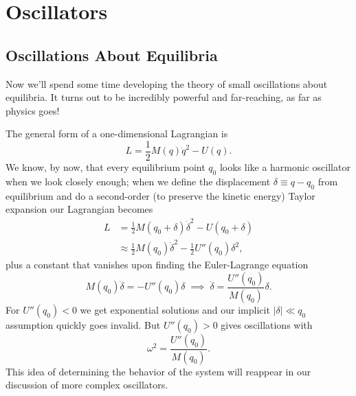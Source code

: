\documentclass[../p111main.tex]{subfiles}
\begin{document}
\chapter{Oscillators}
\section{Oscillations About Equilibria}
Now we'll spend some time developing the theory of small oscillations about equilibria.
It turns out to be incredibly powerful and far-reaching, as far as physics goes!

The general form of a one-dimensional Lagrangian is
\[ L = \frac{1}{2} M(q) \dot q^2 - U(q). \]
We know, by now, that every equilibrium point $q_0$ looks like a harmonic oscillator when we look closely enough; when we define the displacement $\delta \equiv q - q_0$ from equilibrium and do a second-order (to preserve the kinetic energy) Taylor expansion our Lagrangian becomes
\begin{align*}
    L &= \frac{1}{2} M(q_0 + \delta) \dot \delta^2 - U(q_0 + \delta) \\
    &\approx \frac{1}{2} M(q_0) \dot \delta^2 - \frac{1}{2}U''(q_0) \delta^2,
\end{align*}
plus a constant that vanishes upon finding the Euler-Lagrange equation
\[ M(q_0) \ddot \delta = -U''(q_0) \delta \;\implies\; \ddot \delta = \frac{U''(q_0)}{M(q_0)} \delta. \]
For $U''(q_0) < 0$ we get exponential solutions and our implicit $|\delta| \ll q_0$ assumption quickly goes invalid.
But $U''(q_0) > 0$ gives oscillations with
\[ \omega^2 = \frac{U''(q_0)}{M(q_0)}. \]
This idea of determining the behavior of the system will reappear in our discussion of more complex oscillators.
\end{document}
